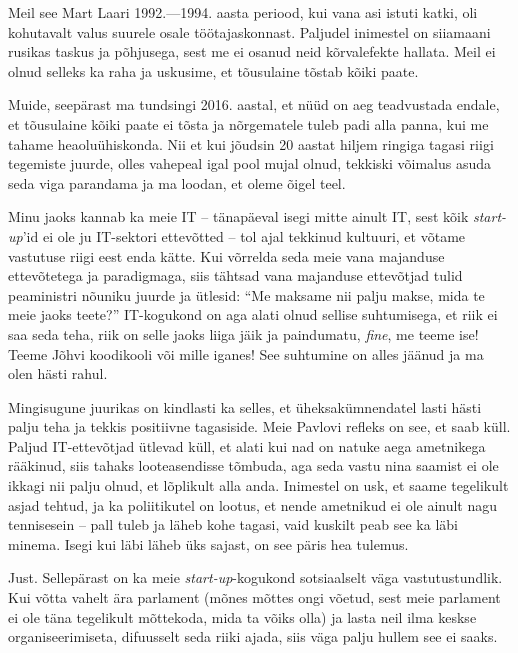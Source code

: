 Meil see Mart Laari  
1992.---1994. aasta periood, kui vana asi istuti katki, oli kohutavalt valus suurele 
osale töötajaskonnast. Paljudel inimestel on siiamaani rusikas taskus ja põhjusega, sest me ei osanud 
neid kõrvalefekte hallata. Meil ei olnud selleks ka raha ja 
uskusime, et tõusulaine tõstab kõiki paate.

Muide, seepärast ma tundsingi 2016. aastal, et nüüd on aeg teadvustada 
endale, et tõusulaine kõiki paate ei tõsta ja nõrgematele tuleb padi alla 
panna, kui me tahame heaoluühiskonda. Nii et kui jõudsin 20 aastat 
hiljem ringiga tagasi riigi tegemiste juurde, olles vahepeal igal pool mujal 
olnud, tekkiski võimalus asuda seda viga parandama ja ma loodan, et 
oleme õigel teel.


Minu jaoks kannab ka meie IT -- tänapäeval isegi mitte ainult IT, sest kõik 
\emph{start-up}'id ei ole ju IT-sektori ettevõtted -- tol ajal tekkinud 
kultuuri, et võtame vastutuse riigi eest enda kätte. Kui võrrelda 
seda meie vana majanduse ettevõtetega ja paradigmaga, siis tähtsad vana majanduse 
ettevõtjad tulid peaministri nõuniku juurde ja ütlesid: \enquote{Me maksame nii palju makse, mida te meie jaoks teete?} 
IT-kogukond on aga alati olnud sellise suhtumisega, et riik ei saa seda 
teha, riik on selle jaoks liiga jäik ja paindumatu, \emph{fine}, me teeme ise! 
Teeme Jõhvi koodikooli või mille iganes! See suhtumine on alles jäänud ja ma 
olen hästi rahul. 

Mingisugune juurikas on kindlasti ka selles, et 
üheksakümnendatel lasti hästi palju teha ja tekkis positiivne tagasiside. 
Meie Pavlovi refleks on see, et saab küll. Paljud 
IT-ettevõtjad ütlevad küll, et alati kui nad on natuke aega ametnikega rääkinud, siis tahaks looteasendisse tõmbuda, aga seda vastu nina saamist ei ole ikkagi 
nii palju olnud, et lõplikult alla anda. Inimestel on 
usk, et saame tegelikult asjad tehtud, ja ka poliitikutel 
on lootus, et nende ametnikud ei ole ainult nagu tennisesein -- pall tuleb ja 
läheb kohe tagasi, vaid kuskilt peab see ka läbi minema. Isegi kui 
läbi läheb üks sajast, on see päris hea tulemus.


Just. Sellepärast on ka meie \emph{start-up}-kogukond sotsiaalselt väga
vastutustundlik. Kui võtta vahelt ära parlament (mõnes
mõttes ongi võetud, sest meie parlament ei ole täna tegelikult mõttekoda, 
mida ta võiks olla) ja lasta neil ilma keskse organiseerimiseta, difuusselt 
seda riiki ajada, siis väga palju hullem see ei saaks.


